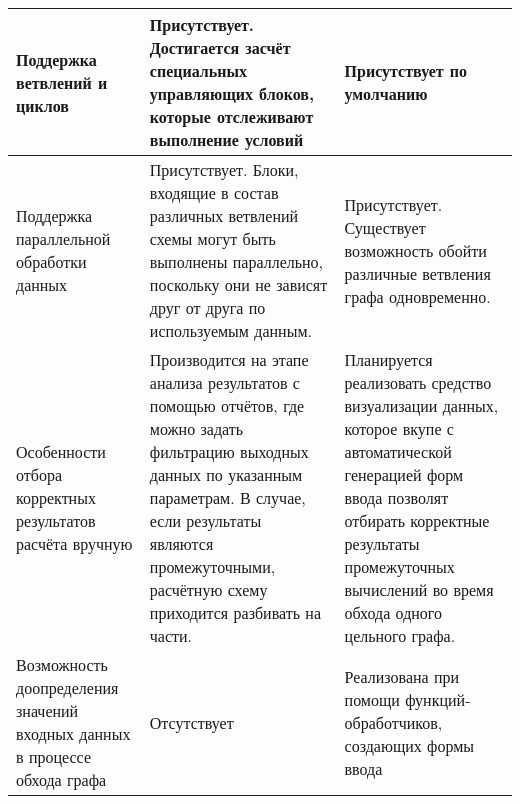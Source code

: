 \begin{longtable}{|p{3.5cm}|p{6.5cm}|p{6.5cm}|}
    \hline
    Поддержка ветвлений и циклов & Присутствует. Достигается засчёт специальных управляющих блоков, которые отслеживают выполнение условий & Присутствует по умолчанию\\
    \hline
    Поддержка параллельной обработки данных & Присутствует. Блоки, входящие в состав различных ветвлений схемы могут быть выполнены параллельно, поскольку они не зависят друг от друга по используемым данным. & Присутствует. Существует возможность обойти различные ветвления графа одновременно.\\
    \hline
    Особенности отбора корректных результатов расчёта вручную & Производится на этапе анализа результатов с помощью отчётов, где можно задать фильтрацию выходных данных по указанным параметрам. В случае, если результаты являются промежуточными, расчётную схему приходится разбивать на части. & Планируется реализовать средство визуализации данных, которое вкупе с автоматической генерацией форм ввода позволят отбирать корректные результаты промежуточных вычислений во время обхода одного цельного графа. \\
    \hline
    Возможность доопределения значений входных данных в процессе обхода графа & Отсутствует & Реализована при помощи функций-обработчиков, создающих формы ввода \\
    \hline
\end{longtable}




